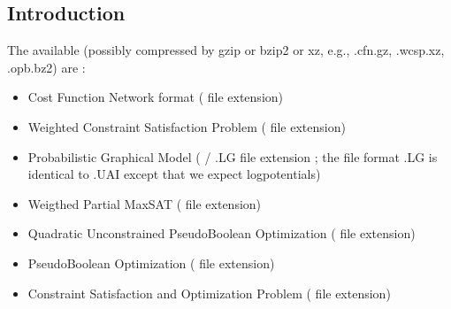 \documentclass[letterpaper,10pt,openany,oneside,english]{sphinxmanual}
\begin{document}
\subsection{Introduction}
\label{\detokenize{userdoc:introduction}}
\sphinxAtStartPar
The available  (possibly compressed by gzip or bzip2 or xz, e.g., .cfn.gz, .wcsp.xz, .opb.bz2) are :
\begin{itemize}
\item {} 
\sphinxAtStartPar
Cost Function Network format ({\hyperref[\detokenize{formats/cfnformat:cfn-format}]{}} file extension)

\item {} 
\sphinxAtStartPar
Weighted Constraint Satisfaction Problem ({\hyperref[\detokenize{formats/wcspformat:wcsp-format}]{}} file extension)

\item {} 
\sphinxAtStartPar
Probabilistic Graphical Model ( / .LG file extension ; the file format .LG is identical to .UAI except that we expect log\sphinxhyphen{}potentials)

\item {} 
\sphinxAtStartPar
Weigthed Partial Max\sphinxhyphen{}SAT ( file extension)

\item {} 
\sphinxAtStartPar
Quadratic Unconstrained Pseudo\sphinxhyphen{}Boolean Optimization ({\hyperref[\detokenize{formats/qpboformat:qpbo-format}]{}} file extension)

\item {} 
\sphinxAtStartPar
Pseudo\sphinxhyphen{}Boolean Optimization ( file extension)

\item {} 
\sphinxAtStartPar
Constraint Satisfaction and Optimization Problem ( file extension)

\end{itemize}
\end{document}
